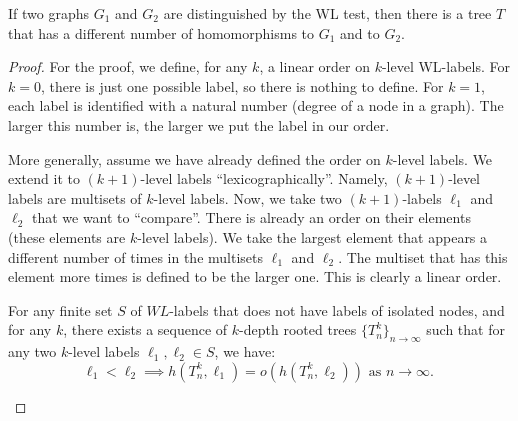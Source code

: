 \documentclass[10pt,a4paper]{amsart}
\begin{document}
\begin{theorem}
    If two graphs $G_1$ and $G_2$ are distinguished by the WL test, then there is a tree $T$ that has a different number of homomorphisms to $G_1$ and to $G_2$.
\end{theorem}

\begin{proof}




    For the proof, we define, for any $k$, a linear order on $k$-level WL-labels. For $k = 0$, there is just one possible label, so there is nothing to define. For $k = 1$, each label is identified with a natural number (degree of a node in a graph). The larger this number is, the larger we put the label in our order.

    More generally, assume we have already defined the order on $k$-level labels. We extend it to $(k+1)$-level labels ``lexicographically''. Namely, $(k+1)$-level labels are multisets of $k$-level labels. Now, we take two $(k+1)$-labels $\ell_1$ and $\ell_2$ that we want to ``compare''. There is already an order on their elements (these elements are $k$-level labels). We take the largest element that appears a different number of times in the multisets $\ell_1$ and $\ell_2$. The multiset that has this element more times is defined to be the larger one. This is clearly a linear order.


\begin{lemma}
\label{lem_dom}
    For any finite set $S$ of $WL$-labels that does not have labels of isolated nodes, and for any $k$, there exists  a sequence of $k$-depth rooted trees $\{T^k_n\}_{n\to\infty}$ such that for any two $k$-level labels $\ell_1, \ell_2\in S$, we have:
     \begin{equation}
     \label{eq_order}
         \ell_1 < \ell_2 \implies h(T^k_n, \ell_1) = o(h(T^k_n, \ell_2)) \text{ as } n\to\infty.\
     \end{equation}
\end{lemma}




\end{proof}
\end{document}
